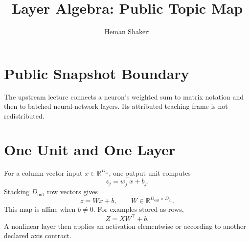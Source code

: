 \documentclass{article}
\title{Layer Algebra: Public Topic Map}
\author{Heman Shakeri}
\date{}
\begin{document}
\maketitle

\section*{Public Snapshot Boundary}

The upstream lecture connects a neuron's weighted sum to matrix notation and then to
batched neural-network layers. Its attributed teaching frame is not redistributed.

\section{One Unit and One Layer}

For a column-vector input $x\in\mathbb{R}^{D_{\mathrm{in}}}$, one output unit computes
\[
  z_j=w_j^\top x+b_j.
\]
Stacking $D_{\mathrm{out}}$ row vectors gives
\[
  z=Wx+b,
  \qquad
  W\in\mathbb{R}^{D_{\mathrm{out}}\times D_{\mathrm{in}}}.
\]
This map is affine when $b\ne0$. For examples stored as rows,
\[
  Z=XW^\top+b.
\]
A nonlinear layer then applies an activation elementwise or according to another
declared axis contract.

\end{document}
